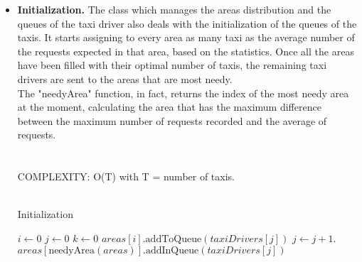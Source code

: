 		\begin{itemize}
			\item \textbf{Initialization.} The class which manages the areas distribution and the queues of the taxi driver also deals with the initialization of the queues of the taxis. It starts assigning to every area as many taxi as the average number of the requests expected in that area, based on the statistics. Once all the areas have been filled with their optimal number of taxis, the remaining taxi drivers are sent to the areas that are most needy.\\The "needyArea" function, in fact, returns the index of the most needy area at the moment, calculating the area that has the maximum difference between the maximum number of requests recorded and the average of requests.\\
			 \\\\
			COMPLEXITY: O(T) with T = number of taxis.\\\\
			
			\begin{algorithm}
				\caption{Initialization}
				\begin{algorithmic}[1]
					\State $i \gets \textit{0}$
					\State $j \gets \textit{0}$
						\State $k \gets \textit{0}$
								\State $areas[i].\text{addToQueue}(taxiDrivers[j])$
								\State $j \gets j+1$.
								\EndFor
						\EndFor
							\State $areas[\text{needyArea} (areas)].\text{addInQueue}(taxiDrivers[j])$
						\EndFor
					\EndIf
					\EndProcedure
				\end{algorithmic}
			\end{algorithm}
			

\end{itemize}
